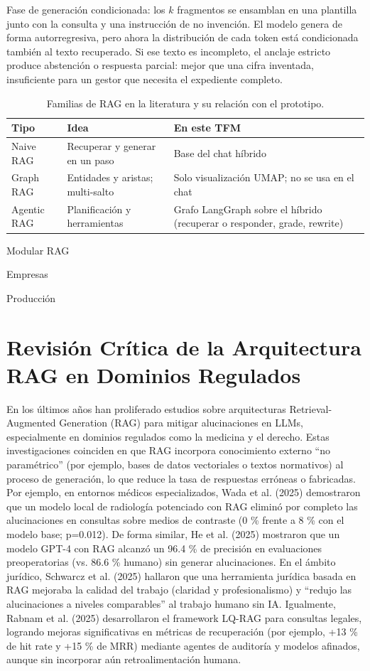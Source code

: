 Fase de generación condicionada: los $k$ fragmentos se ensamblan en una plantilla junto con la consulta y una instrucción de no invención. El modelo genera de forma autorregresiva, pero ahora la distribución de cada token está condicionada también al texto recuperado. Si ese texto es incompleto, el anclaje estricto produce abstención o respuesta parcial: mejor que una cifra inventada, insuficiente para un gestor que necesita el expediente completo.

\begin{table}[htbp]
\centering
\caption{Familias de RAG en la literatura y su relación con el prototipo.}
\label{tab:rag-tipos}
\begin{tabular}{p{3.2cm}p{5.4cm}p{5.4cm}}
\toprule
\textbf{Tipo} & \textbf{Idea} & \textbf{En este TFM} \\
\midrule
Naive RAG & Recuperar y generar en un paso & Base del chat híbrido \\
Graph RAG & Entidades y aristas; multi-salto & Solo visualización UMAP; no se usa en el chat \\
Agentic RAG & Planificación y herramientas & Grafo LangGraph sobre el híbrido (recuperar o responder, grade, rewrite) \\
\bottomrule
\end{tabular}
\end{table}

Modular RAG

Empresas

Producción

\section{Revisión Crítica de la Arquitectura RAG en Dominios Regulados}
En los últimos años han proliferado estudios sobre arquitecturas Retrieval-Augmented Generation (RAG) para mitigar alucinaciones en LLMs, especialmente en dominios regulados como la medicina y el derecho. Estas investigaciones coinciden en que RAG incorpora conocimiento externo ``no paramétrico'' (por ejemplo, bases de datos vectoriales o textos normativos) al proceso de generación, lo que reduce la tasa de respuestas erróneas o fabricadas. Por ejemplo, en entornos médicos especializados, Wada et al. (2025) demostraron que un modelo local de radiología potenciado con RAG eliminó por completo las alucinaciones en consultas sobre medios de contraste (0 \% frente a 8 \% con el modelo base; p=0.012). De forma similar, He et al. (2025) mostraron que un modelo GPT-4 con RAG alcanzó un 96.4 \% de precisión en evaluaciones preoperatorias (vs. 86.6 \% humano) sin generar alucinaciones. En el ámbito jurídico, Schwarcz et al. (2025) hallaron que una herramienta jurídica basada en RAG mejoraba la calidad del trabajo (claridad y profesionalismo) y ``redujo las alucinaciones a niveles comparables'' al trabajo humano sin IA. Igualmente, Rabnam et al. (2025) desarrollaron el framework LQ-RAG para consultas legales, logrando mejoras significativas en métricas de recuperación (por ejemplo, +13 \% de hit rate y +15 \% de MRR) mediante agentes de auditoría y modelos afinados, aunque sin incorporar aún retroalimentación humana.

